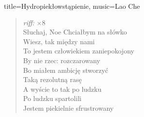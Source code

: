 \newpage
\small
\begin{song}{title={Hydropiekłowstąpienie}, music={Lao Che}}
\begin{multicols}{2}
    \begin{intro}
           
    \end{intro}
    \begin{verse} 
        \textit{riff: }     $\times 8$ \\  
        Słuchaj, Noe
        Chciałbym na słówko \\
        Wiesz, tak między nami \\
        To jestem człowiekiem zaniepokojony \\
        By nie rzec: rozczarowany  \\
        Bo miałem ambicję stworzyć \\
        Taką rezolutną rasę \\
        A wyście to tak po ludzku \\
        Po ludzku spartolili \\
        Jestem piekielnie sfrustrowany \\
        

\end{verse}
\end{multicols}
\end{song}
